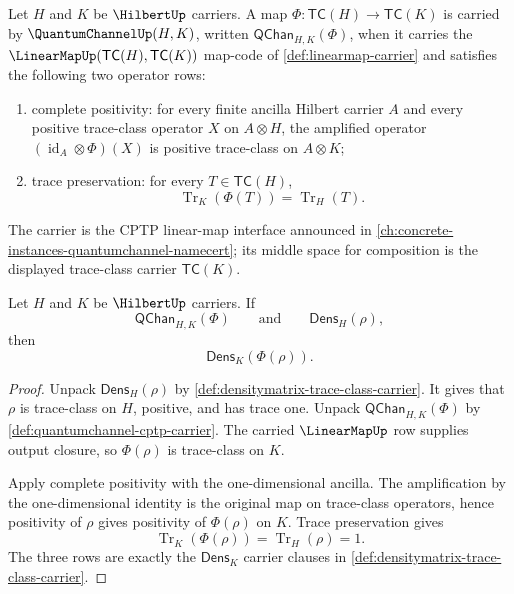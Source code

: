 \begin{definition}
\label{def:quantumchannel-cptp-carrier}
Let $H$ and $K$ be $\HilbertUp$ carriers. A map $\Phi:\mathsf{TC}(H)\to\mathsf{TC}(K)$ is carried by $\QuantumChannelUp(H,K)$, written $\mathsf{QChan}_{H,K}(\Phi)$, when it carries the $\LinearMapUp(\mathsf{TC}(H),\mathsf{TC}(K))$ map-code of \autoref{def:linearmap-carrier} and satisfies the following two operator rows:
\begin{enumerate}
  \item complete positivity: for every finite ancilla Hilbert carrier $A$ and every positive trace-class operator $X$ on $A\otimes H$, the amplified operator $(\operatorname{id}_A\otimes\Phi)(X)$ is positive trace-class on $A\otimes K$;
  \item trace preservation: for every $T\in\mathsf{TC}(H)$,
$$
\operatorname{Tr}_K(\Phi(T))=\operatorname{Tr}_H(T).
$$
\end{enumerate}
The carrier is the CPTP linear-map interface announced in \autoref{ch:concrete-instances-quantumchannel-namecert}; its middle space for composition is the displayed trace-class carrier $\mathsf{TC}(K)$.
\end{definition}

\begin{lemma}
\label{lem:quantumchannel-densitymatrix-image}
Let $H$ and $K$ be $\HilbertUp$ carriers. If
$$
\mathsf{QChan}_{H,K}(\Phi)
\qquad\text{and}\qquad
\mathsf{Dens}_H(\rho),
$$
then
$$
\mathsf{Dens}_K(\Phi(\rho)).
$$
\end{lemma}
\begin{proof}
Unpack $\mathsf{Dens}_H(\rho)$ by \autoref{def:densitymatrix-trace-class-carrier}. It gives that $\rho$ is trace-class on $H$, positive, and has trace one. Unpack $\mathsf{QChan}_{H,K}(\Phi)$ by \autoref{def:quantumchannel-cptp-carrier}. The carried $\LinearMapUp$ row supplies output closure, so $\Phi(\rho)$ is trace-class on $K$.

Apply complete positivity with the one-dimensional ancilla. The amplification by the one-dimensional identity is the original map on trace-class operators, hence positivity of $\rho$ gives positivity of $\Phi(\rho)$ on $K$. Trace preservation gives
$$
\operatorname{Tr}_K(\Phi(\rho))=\operatorname{Tr}_H(\rho)=1.
$$
The three rows are exactly the $\mathsf{Dens}_K$ carrier clauses in \autoref{def:densitymatrix-trace-class-carrier}.
\end{proof}

